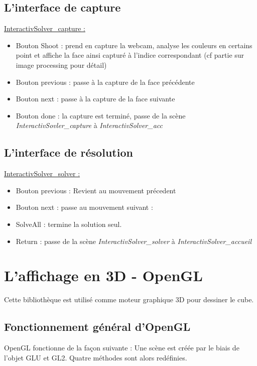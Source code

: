 \subsection{L'interface de capture}
\underline{InteractivSolver\_capture :}
\begin{itemize}
    \item Bouton Shoot : prend en capture la webcam, analyse les couleurs en certains point et affiche la face ainsi capturé à l’indice correspondant (cf partie sur image processing pour détail)
    \item Bouton previous : passe à la capture de la face précédente
    \item Bouton next : passe à la capture de la face suivante
    \item Bouton done : la capture est terminé, passe de la scène \textit{InteractivSovler\_capture} à \textit{InteractivSolver\_acc}
\end{itemize}

\subsection{L'interface de résolution}
\underline{InteractivSolver\_solver :}
\begin{itemize}
    \item Bouton previous : Revient au mouvement précedent
    \item Bouton next : passe au mouvement suivant :
    \item SolveAll : termine la solution seul.
    \item Return : passe de la scène \textit{InteractivSolver\_solver} à \textit{InteractivSolver\_accueil}
\end{itemize}

\section{L'affichage en 3D - OpenGL}

Cette bibliothèque est utilisé comme moteur graphique 3D pour dessiner le cube.

\subsection{Fonctionnement général d'OpenGL}
OpenGL fonctionne de la façon suivante :
	Une scène est créée par le biais de l’objet GLU et GL2.
	Quatre méthodes sont alors redéfinies.

